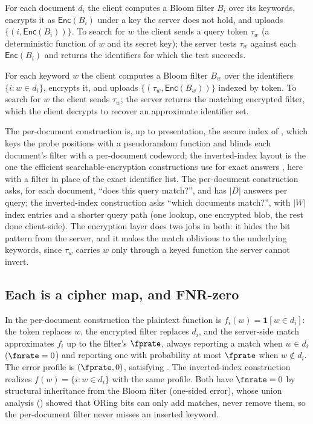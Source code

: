 \begin{definition}
\label{def:per-document-bloom}
For each document $d_i$ the client computes a Bloom filter $B_i$ over its
keywords, encrypts it as $\mathsf{Enc}(B_i)$ under a key the server does
not hold, and uploads $\{(i, \mathsf{Enc}(B_i))\}$. To search for $w$ the
client sends a query token $\tau_w$ (a deterministic function of $w$ and
its secret key); the server tests $\tau_w$ against each
$\mathsf{Enc}(B_i)$ and returns the identifiers for which the test
succeeds.
\end{definition}

\begin{definition}
\label{def:inverted-index-bloom}
For each keyword $w$ the client computes a Bloom filter $B_w$ over the
identifiers $\{i : w \in d_i\}$, encrypts it, and uploads
$\{(\tau_w, \mathsf{Enc}(B_w))\}$ indexed by token. To search for $w$ the
client sends $\tau_w$; the server returns the matching encrypted filter,
which the client decrypts to recover an approximate identifier set.
\end{definition}

The per-document construction is, up to presentation, the secure index
of \textcite{goh-2003}, which keys the probe
positions with a pseudorandom function and blinds each document's filter
with a per-document codeword; the inverted-index layout is the one the
efficient searchable-encryption constructions use for exact answers
\parencite{curtmola-et-al-2006}, here with a filter in place of the exact
identifier list. The per-document construction asks, for each document,
``does this query match?'', and has $|D|$ answers per query; the inverted-index
construction asks ``which documents match?'', with $|W|$ index entries
and a shorter query path (one lookup, one encrypted blob, the rest done
client-side). The encryption layer does two jobs in both: it hides the
bit pattern from the server, and it makes the match oblivious to the
underlying keywords, since $\tau_w$ carries $w$ only through a keyed
function the server cannot invert.

\subsection*{Each is a cipher map, and FNR-zero}

In the per-document construction the plaintext function is $f_i(w) =
\mathbf{1}[w \in d_i]$: the token replaces $w$, the encrypted filter
replaces $d_i$, and the server-side match approximates $f_i$ up to the
filter's $\fprate$, always reporting a match when $w \in d_i$ ($\fnrate =
0$) and reporting one with probability at most $\fprate$ when $w \notin
d_i$. The error profile is $(\fprate, 0)$, satisfying
. The inverted-index construction realizes $f(w) =
\{i : w \in d_i\}$ with the same profile. Both have $\fnrate = 0$ by
structural inheritance from the Bloom filter (one-sided error), whose union analysis
() showed that ORing bits can only add matches,
never remove them, so the per-document filter never misses an inserted
keyword.

